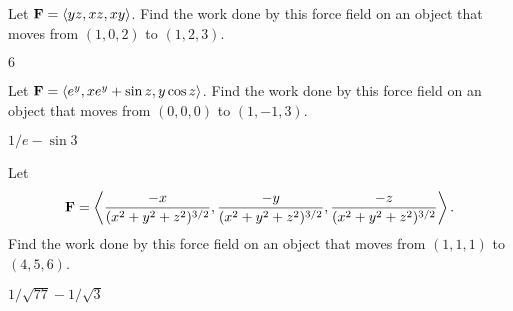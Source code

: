 \begin{enumialphparenastyle}
\begin{ex}
Let 
${\bf F}=
\langle yz,xz,xy\rangle$.
Find the work done by this force field on an object that moves from 
$(1,0,2)$ to $(1,2,3)$.
\begin{sol}
	$6$
\end{sol}
\end{ex}

\begin{ex}
Let 
${\bf F}=
\langle e^y,xe^y+\sin z,y\cos z\rangle$.
Find the work done by this force field on an object that moves from 
$(0,0,0)$ to $(1,-1,3)$.
\begin{sol}
	$1/e-\sin3$
\end{sol}
\end{ex}

\begin{ex}
Let 
$${\bf F}=
\left
\langle {-x\over (x^2+y^2+z^2)^{3/2}},{-y\over (x^2+y^2+z^2)^{3/2}},{-z\over
  (x^2+y^2+z^2)^{3/2}}\right\rangle.$$
Find the work done by this force field on an object that moves from 
$(1,1,1)$ to $(4,5,6)$.
\begin{sol}
	$1/\sqrt{77}-1/\sqrt3$
\end{sol}
\end{ex}

\end{enumialphparenastyle}
